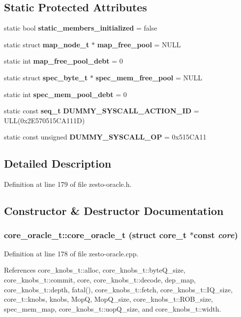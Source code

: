 \subsection*{Static Protected Attributes}
\begin{CompactItemize}
\item 
static bool {\bf static\_\-members\_\-initialized} = false
\item 
static struct {\bf map\_\-node\_\-t} $\ast$ {\bf map\_\-free\_\-pool} = NULL
\item 
static int {\bf map\_\-free\_\-pool\_\-debt} = 0
\item 
static struct {\bf spec\_\-byte\_\-t} $\ast$ {\bf spec\_\-mem\_\-free\_\-pool} = NULL
\item 
static int {\bf spec\_\-mem\_\-pool\_\-debt} = 0
\item 
static const {\bf seq\_\-t} {\bf DUMMY\_\-SYSCALL\_\-ACTION\_\-ID} = ULL(0x2E570515CA111D)
\item 
static const unsigned {\bf DUMMY\_\-SYSCALL\_\-OP} = 0x515CA11
\end{CompactItemize}


\subsection{Detailed Description}


Definition at line 179 of file zesto-oracle.h.

\subsection{Constructor \& Destructor Documentation}
\subsubsection[{core\_\-oracle\_\-t}]{\setlength{\rightskip}{0pt plus 5cm}core\_\-oracle\_\-t::core\_\-oracle\_\-t (struct {\bf core\_\-t} $\ast$const  {\em core})}\label{classcore__oracle__t_ee5b386437040a0500ffbc2a677a52d3}




Definition at line 178 of file zesto-oracle.cpp.

References core\_\-knobs\_\-t::alloc, core\_\-knobs\_\-t::byteQ\_\-size, core\_\-knobs\_\-t::commit, core, core\_\-knobs\_\-t::decode, dep\_\-map, core\_\-knobs\_\-t::depth, fatal(), core\_\-knobs\_\-t::fetch, core\_\-knobs\_\-t::IQ\_\-size, core\_\-t::knobs, knobs, MopQ, MopQ\_\-size, core\_\-knobs\_\-t::ROB\_\-size, spec\_\-mem\_\-map, core\_\-knobs\_\-t::uopQ\_\-size, and core\_\-knobs\_\-t::width.

